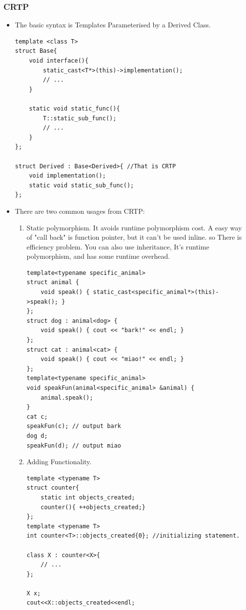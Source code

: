 \documentclass[a4paper,11pt,twoside]{book}
\begin{document}
\subsubsection{CRTP}
\begin{itemize}
	\item The basic syntax is Templates Parameterised by a Derived Class.
	
\begin{lstlisting}[numbers=none]
template <class T> 
struct Base{
	void interface(){
		static_cast<T*>(this)->implementation();
		// ...
	}
	
	static void static_func(){
		T::static_sub_func();
		// ...
	}
};
	
struct Derived : Base<Derived>{ //That is CRTP
	void implementation();
	static void static_sub_func();
};
\end{lstlisting}
	
	
	\item There are two common usages from CRTP:
	\begin{enumerate}
		\item Static polymorphism. It avoids runtime polymorphism cost.  A easy way of "call back" is function pointer, but it can't be used inline. so There is efficiency problem. You can also use inheritance, It's runtime polymorphism, and has some runtime overhead. 
\begin{lstlisting}[numbers=none]
template<typename specific_animal>
struct animal {
	void speak() { static_cast<specific_animal*>(this)->speak(); }
};
struct dog : animal<dog> {
	void speak() { cout << "bark!" << endl; }
};
struct cat : animal<cat> {
	void speak() { cout << "miao!" << endl; }
};
template<typename specific_animal>
void speakFun(animal<specific_animal> &animal) {
	animal.speak();
}
cat c;
speakFun(c); // output bark
dog d;
speakFun(d); // output miao
\end{lstlisting}

\item Adding Functionality.

\begin{lstlisting}[]
template <typename T>
struct counter{
	static int objects_created;
	counter(){ ++objects_created;}
};
template <typename T> 
int counter<T>::objects_created{0}; //initializing statement.

class X : counter<X>{
	// ...
};

X x;
cout<<X::objects_created<<endl;
\end{lstlisting}

	\end{enumerate}


\end{itemize}
\end{document}
